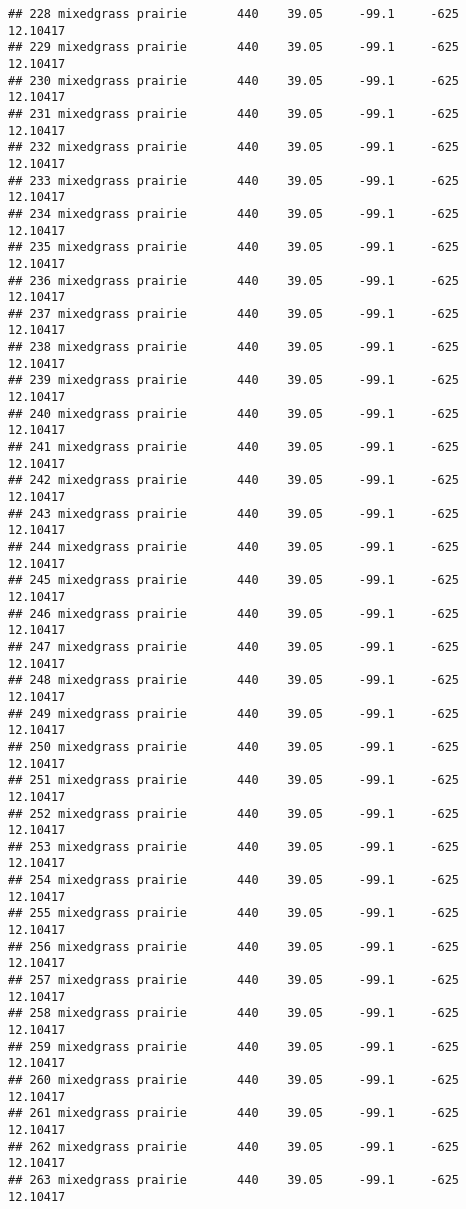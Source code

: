 \documentclass[]{article}
\begin{document}
\begin{verbatim}
## 228 mixedgrass prairie       440    39.05     -99.1     -625 12.10417
## 229 mixedgrass prairie       440    39.05     -99.1     -625 12.10417
## 230 mixedgrass prairie       440    39.05     -99.1     -625 12.10417
## 231 mixedgrass prairie       440    39.05     -99.1     -625 12.10417
## 232 mixedgrass prairie       440    39.05     -99.1     -625 12.10417
## 233 mixedgrass prairie       440    39.05     -99.1     -625 12.10417
## 234 mixedgrass prairie       440    39.05     -99.1     -625 12.10417
## 235 mixedgrass prairie       440    39.05     -99.1     -625 12.10417
## 236 mixedgrass prairie       440    39.05     -99.1     -625 12.10417
## 237 mixedgrass prairie       440    39.05     -99.1     -625 12.10417
## 238 mixedgrass prairie       440    39.05     -99.1     -625 12.10417
## 239 mixedgrass prairie       440    39.05     -99.1     -625 12.10417
## 240 mixedgrass prairie       440    39.05     -99.1     -625 12.10417
## 241 mixedgrass prairie       440    39.05     -99.1     -625 12.10417
## 242 mixedgrass prairie       440    39.05     -99.1     -625 12.10417
## 243 mixedgrass prairie       440    39.05     -99.1     -625 12.10417
## 244 mixedgrass prairie       440    39.05     -99.1     -625 12.10417
## 245 mixedgrass prairie       440    39.05     -99.1     -625 12.10417
## 246 mixedgrass prairie       440    39.05     -99.1     -625 12.10417
## 247 mixedgrass prairie       440    39.05     -99.1     -625 12.10417
## 248 mixedgrass prairie       440    39.05     -99.1     -625 12.10417
## 249 mixedgrass prairie       440    39.05     -99.1     -625 12.10417
## 250 mixedgrass prairie       440    39.05     -99.1     -625 12.10417
## 251 mixedgrass prairie       440    39.05     -99.1     -625 12.10417
## 252 mixedgrass prairie       440    39.05     -99.1     -625 12.10417
## 253 mixedgrass prairie       440    39.05     -99.1     -625 12.10417
## 254 mixedgrass prairie       440    39.05     -99.1     -625 12.10417
## 255 mixedgrass prairie       440    39.05     -99.1     -625 12.10417
## 256 mixedgrass prairie       440    39.05     -99.1     -625 12.10417
## 257 mixedgrass prairie       440    39.05     -99.1     -625 12.10417
## 258 mixedgrass prairie       440    39.05     -99.1     -625 12.10417
## 259 mixedgrass prairie       440    39.05     -99.1     -625 12.10417
## 260 mixedgrass prairie       440    39.05     -99.1     -625 12.10417
## 261 mixedgrass prairie       440    39.05     -99.1     -625 12.10417
## 262 mixedgrass prairie       440    39.05     -99.1     -625 12.10417
## 263 mixedgrass prairie       440    39.05     -99.1     -625 12.10417

\end{verbatim}
\end{document}
